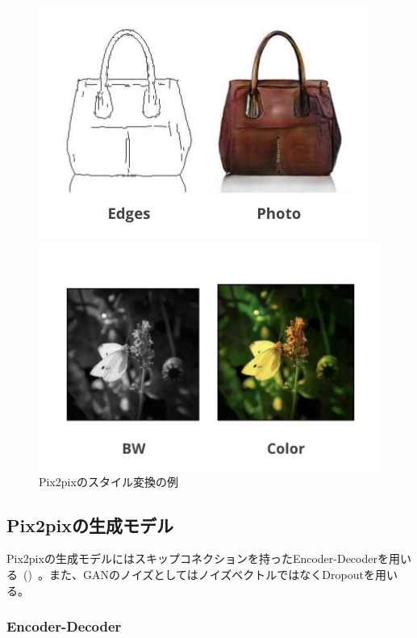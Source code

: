 \begin{figure}[b]
\centering
\begin{minipage}[b]{0.48\columnwidth}
\centering
\includegraphics[width=0.7\columnwidth]{figure/EP.png}
\end{minipage}
\begin{minipage}[b]{0.48\columnwidth}
\centering
\includegraphics[width=0.7\columnwidth]{figure/BWC.png}
\end{minipage}
\caption{Pix2pixのスタイル変換の例}
\label{fig:pix2pix_img}
\end{figure}

\clearpage

\subsection{Pix2pixの生成モデル}

Pix2pixの生成モデルにはスキップコネクションを持ったEncoder-Decoderを用いる~()~。また、GANのノイズとしてはノイズベクトルではなくDropoutを用いる。

\subsubsection{Encoder-Decoder}

